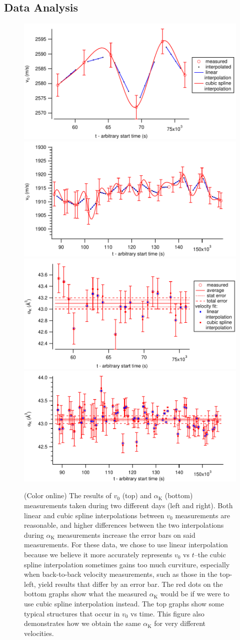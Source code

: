 \documentclass[twocolumn,prl,showpacs,superscriptaddress]{revtex4-1}   %
\newcommand{\ak}{\alpha_{\textrm{K}}}
\begin{document}
\subsection{Data Analysis}

\begin{figure}
\includegraphics[width=0.49\linewidth,keepaspectratio]{velVsTime_150212.pdf}
\includegraphics[width=0.49\linewidth,keepaspectratio]{velVsTime_150413.pdf}
\includegraphics[width=0.49\linewidth,keepaspectratio]{polVsTime_150212.pdf}
\includegraphics[width=0.49\linewidth,keepaspectratio]{polVsTime_150413.pdf}
\caption{\label{velPolVsTimeExample}(Color online) The results of $v_0$ (top) and $\ak$ (bottom) measurements taken during two different days (left and right). Both linear and cubic spline interpolations between $v_0$ measurements are reasonable, and higher differences between the two interpolations during $\ak$ measurements increase the error bars on said measurements. For these data, we chose to use linear interpolation because we believe it more accurately represents $v_0$ vs $t$--the cubic spline interpolation sometimes gains too much curviture, especially when back-to-back velocity measurements, such as those in the top-left, yield results that differ by an error bar. The red dots on the bottom graphs show what the measured $\ak$ would be if we were to use cubic spline interpolation instead. The top graphs show some typical structures that occur in $v_0$ vs time. This figure also demonstrates how we obtain the same $\ak$ for very different velocities.}
\end{figure}
\end{document}
